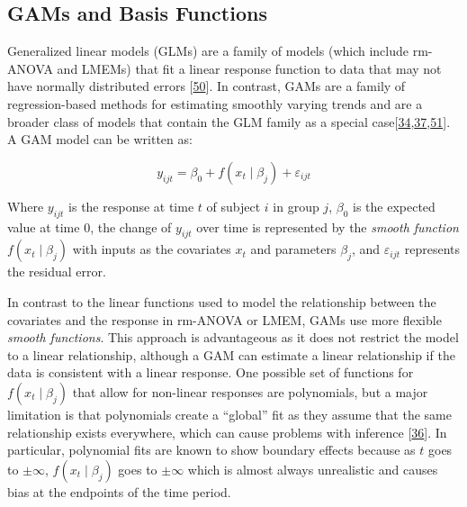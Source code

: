 \documentclass[
]{article}
\begin{document}
\hypertarget{gams-and-basis-functions}{%
\subsection{GAMs and Basis Functions}\label{gams-and-basis-functions}}

Generalized linear models (GLMs) are a family of models (which include rm-ANOVA and LMEMs) that fit a linear response function to data that may not have normally distributed errors {[}\protect\hyperlink{ref-nelder1972}{50}{]}. In contrast, GAMs are a family of regression-based methods for estimating smoothly varying trends and are a broader class of models that contain the GLM family as a special case{[}\protect\hyperlink{ref-simpson2018}{34},\protect\hyperlink{ref-wood2017}{37},\protect\hyperlink{ref-hastie1987}{51}{]}. A GAM model can be written as:

\begin{equation}
  y_{ijt}=\beta_0+f(x_t\mid \beta_j)+\varepsilon_{ijt}
  \label{eq:GAM}
\end{equation}

Where \(y_{ijt}\) is the response at time \(t\) of subject \(i\) in group \(j\), \(\beta_0\) is the expected value at time 0, the change of \(y_{ijt}\) over time is represented by the \emph{smooth function} \(f(x_t\mid \beta_j)\) with inputs as the covariates \(x_t\) and parameters \(\beta_j\), and \(\varepsilon_{ijt}\) represents the residual error.

In contrast to the linear functions used to model the relationship between the covariates and the response in rm-ANOVA or LMEM, GAMs use more flexible \emph{smooth functions}. This approach is advantageous as it does not restrict the model to a linear relationship, although a GAM can estimate a linear relationship if the data is consistent with a linear response. One possible set of functions for \(f(x_t\mid \beta_j)\) that allow for non-linear responses are polynomials, but a major limitation is that polynomials create a ``global'' fit as they assume that the same relationship exists everywhere, which can cause problems with inference {[}\protect\hyperlink{ref-beck1998}{36}{]}. In particular, polynomial fits are known to show boundary effects because as \(t\) goes to \(\pm \infty\), \(f(x_t \mid \beta_j)\) goes to \(\pm \infty\) which is almost always unrealistic and causes bias at the endpoints of the time period.
\end{document}
